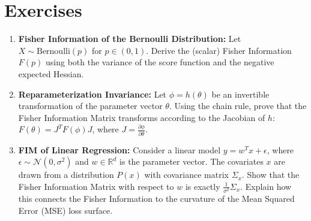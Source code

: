 \section{Exercises}

\begin{enumerate}
    \item \textbf{Fisher Information of the Bernoulli Distribution:} Let $X \sim \text{Bernoulli}(p)$ for $p \in (0,1)$. Derive the (scalar) Fisher Information $F(p)$ using both the variance of the score function and the negative expected Hessian.
    \item \textbf{Reparameterization Invariance:} Let $\phi = h(\theta)$ be an invertible transformation of the parameter vector $\theta$. Using the chain rule, prove that the Fisher Information Matrix transforms according to the Jacobian of $h$: $F(\theta) = J^T F(\phi) J$, where $J = \frac{\partial \phi}{\partial \theta}$.
    \item \textbf{FIM of Linear Regression:} Consider a linear model $y = w^T x + \epsilon$, where $\epsilon \sim \mathcal{N}(0, \sigma^2)$ and $w \in \mathbb{R}^d$ is the parameter vector. The covariates $x$ are drawn from a distribution $P(x)$ with covariance matrix $\Sigma_x$. Show that the Fisher Information Matrix with respect to $w$ is exactly $\frac{1}{\sigma^2} \Sigma_x$. Explain how this connects the Fisher Information to the curvature of the Mean Squared Error (MSE) loss surface.
\end{enumerate}

